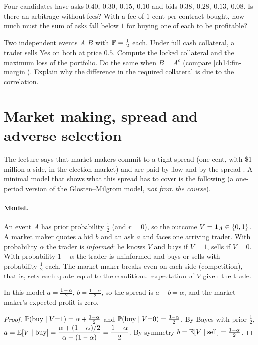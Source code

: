 \begin{paracol}{2}
\begin{exercise}\label{ch14:ex-arb}
Four candidates have asks $0.40,\ 0.30,\ 0.15,\ 0.10$ and bids $0.38,\ 0.28,\ 0.13,\ 0.08$. Is there an arbitrage without fees? With a fee of $1$ cent per
contract bought, how much must the sum of asks fall below $1$ for buying one of each to be profitable?
\end{exercise}

\begin{exercise}\label{ch14:ex-portfolio-margin}
Two independent events $A,B$ with $\mathbb{P}=\tfrac12$ each. Under full cash collateral, a trader sells Yes on both at price $0.5$. Compute the
locked collateral and the maximum loss of the portfolio. Do the same when $B=A^c$ (compare \cref{ch14:fin-margin}). Explain why the
difference in the required collateral is due to the correlation.
\end{exercise}

\section{Market making, spread and adverse selection}\label{ch14:sec-mm}

The lecture says that market makers commit to a tight spread (one cent, with \$1 million a side, in the election market) and are paid
by flow and by the spread . A minimal model that shows what this spread has to cover is
the following (a one-period version of the Glosten--Milgrom model, \emph{not from the course}).

\paragraph{Model.} An event $A$ has prior probability $\tfrac12$ (and $r=0$), so the outcome $V=\mathbf{1}_A\in\{0,1\}$.
A market maker quotes a bid $b$ and an ask $a$ and faces one arriving trader. With probability $\alpha$ the trader is
\emph{informed}: he knows $V$ and buys if $V=1$, sells if $V=0$. With probability $1-\alpha$ the trader is
uninformed and buys or sells with probability $\tfrac12$ each. The market maker breaks even on each side (competition), that
is, sets each quote equal to the conditional expectation of $V$ given the trade.

\begin{proposition}\label{ch14:prop-gm}
In this model $a=\tfrac{1+\alpha}{2}$, $b=\tfrac{1-\alpha}{2}$, so the spread is $a-b=\alpha$, and the market maker's expected profit is zero.
\end{proposition}
\begin{proof}
$\mathbb{P}(\text{buy}\mid V{=}1)=\alpha+\tfrac{1-\alpha}{2}$ and $\mathbb{P}(\text{buy}\mid V{=}0)=\tfrac{1-\alpha}{2}$. By Bayes with prior
$\tfrac12$, $a=\mathbb{E}[V\mid\text{buy}]=\dfrac{\alpha+(1-\alpha)/2}{\alpha+(1-\alpha)}=\dfrac{1+\alpha}{2}$. By symmetry
$b=\mathbb{E}[V\mid\text{sell}]=\tfrac{1-\alpha}2$.
\end{proof}


\end{paracol}

